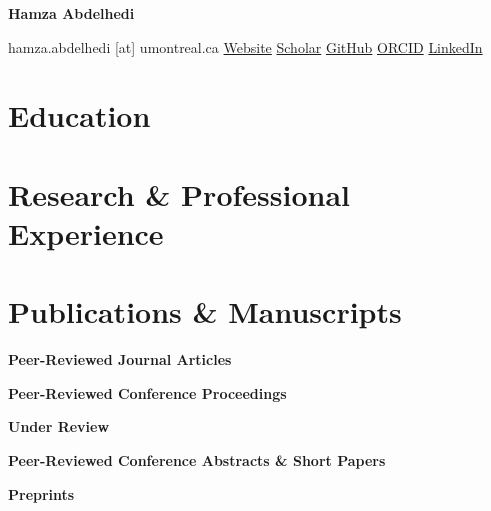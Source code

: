 \documentclass[10pt,a4paper]{article}
\newcommand{\cvpubcategory}[1]{%
    \Needspace{3\baselineskip}
    \vspace{3pt}
    {\normalsize\bfseries #1\par}
    \vspace{3pt}
}
\begin{document}
{\centering
    {\LARGE\bfseries Hamza Abdelhedi}\par

    \vspace{3pt}

    {\small
    hamza.abdelhedi [at] umontreal.ca
    \quad\textbullet\quad
    \href{https://www.hamzaabdelhedi.com}{Website}
    \quad\textbullet\quad
    \href{https://scholar.google.com/citations?user=xcX55QsAAAAJ&hl=en}{Scholar}
    \quad\textbullet\quad
    \href{https://github.com/BabaSanfour}{GitHub}
    \quad\textbullet\quad
    \href{https://orcid.org/0000-0002-4638-640X}{ORCID}
    \quad\textbullet\quad
    \href{https://www.linkedin.com/in/hamza-abdelhedi/}{LinkedIn}
    }\par
}

\section{Education}

\educationPhD
\educationMSc
\educationSUPCOM
\educationPreparatory
\educationHighSchool


\section{Research \& Professional Experience}

\experiencePhDRA
\experienceCHUSJ
\experienceAbundantIntelligences
\experienceMScRA
\experienceEngineeringIntern
\experienceSFM
\experienceHexastack


\section{Publications \& Manuscripts}

\cvpubcategory{Peer-Reviewed Journal Articles}

\pubOswaldResting
\pubDehganMEG
\pubTholkeImbalance


\cvpubcategory{Peer-Reviewed Conference Proceedings}

\pubPNPLRetrospective
\pubPNPL


\cvpubcategory{Under Review}

\pubBenSlimaneEEG
\pubOswaldNOC


\cvpubcategory{Peer-Reviewed Conference Abstracts \& Short Papers}

\pubCCNFaceDynamics
\pubCCNFaceRepresentations


\cvpubcategory{Preprints}
\end{document}
